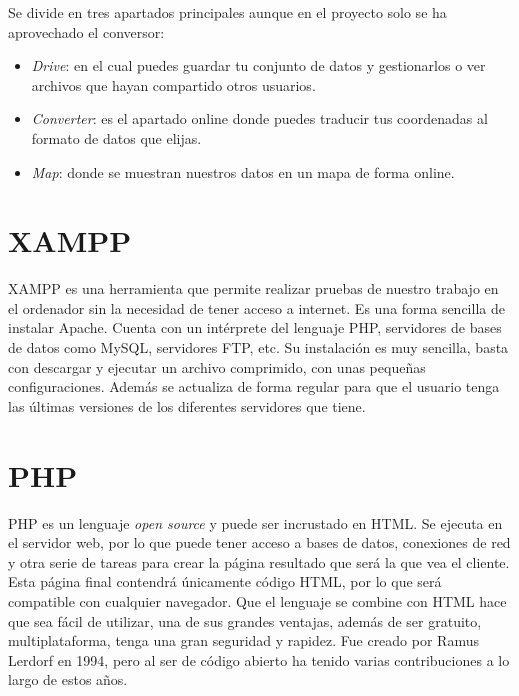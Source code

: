 Se divide en tres apartados principales aunque en el proyecto solo se ha aprovechado el conversor:
\begin{itemize}
\tightlist
\item
	\textit{Drive}: en el cual puedes guardar tu conjunto de datos y gestionarlos o ver archivos que hayan compartido otros usuarios.
\item
	\textit{Converter}: es el apartado online donde puedes traducir tus coordenadas al formato de datos que elijas.
\item
	\textit{Map}: donde se muestran nuestros datos en un mapa de forma online.	
\end{itemize}

\section{XAMPP}
XAMPP \cite{xampp} es una herramienta que permite realizar pruebas de nuestro trabajo en el ordenador sin la necesidad de tener acceso a internet. Es una forma sencilla de instalar Apache.
Cuenta con un intérprete del lenguaje PHP, servidores de bases de datos como MySQL, servidores FTP, etc.
Su instalación es muy sencilla, basta con descargar y ejecutar un archivo comprimido, con unas pequeñas configuraciones. Además se actualiza de forma regular para que el usuario tenga las últimas versiones de los diferentes servidores que tiene.

\section{PHP}
PHP \cite{php} es un lenguaje \textit{open source} y puede ser incrustado en HTML.
Se ejecuta en el servidor web, por lo que puede tener acceso a bases de datos, conexiones de red y otra serie de tareas para crear la página resultado que será la que vea el cliente. Esta página final contendrá únicamente código HTML, por lo que será compatible con cualquier navegador.
Que el lenguaje se combine con HTML hace que sea fácil de utilizar, una de sus grandes ventajas, además de ser gratuito, multiplataforma, tenga una gran seguridad y rapidez.
Fue creado por Ramus Lerdorf en 1994, pero al ser de código abierto ha tenido varias contribuciones a lo largo de estos años.

